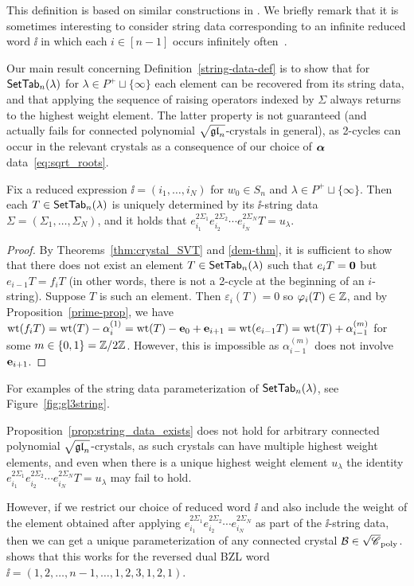 \documentclass[11pt]{article}
\begin{document}
This definition is based on similar constructions in \cite{BZ93,Kashiwara93}.
We briefly remark that it is sometimes interesting to consider string data corresponding to an infinite reduced word $\ii$ in which each $i \in [n-1]$ occurs infinitely often~\cite{BZ01,Littelmann98}.

Our main result concerning Definition~\ref{string-data-def} is to show that for $\mathsf{SetTab}_n(\lambda)$ for $\lambda \in P^+ \sqcup \{\infty\}$  each element can be recovered from its string data, and that applying the sequence of raising operators indexed by $\Sigma$ always returns to the highest weight element.
The latter property is not 
guaranteed (and actually fails for connected polynomial $\sqrt{\mathfrak{gl}_n}$-crystals in general), as 2-cycles can occur in the relevant crystals as a consequence of 
our choice of $\boldsymbol{\alpha}$ data~\eqref{eq:sqrt_roots}.

\begin{proposition}
\label{prop:string_data_exists}
Fix a reduced expression $\ii = (i_1, \dotsc, i_N)$ for $w_0 \in S_n$ and $\lambda \in P^+ \sqcup \{\infty\}$.
Then each $T \in \mathsf{SetTab}_n(\lambda)$ is uniquely determined by its $\ii$-string data $\Sigma = (\Sigma_1, \dotsc, \Sigma_N)$, and it holds that
$
e_{i_1}^{2\Sigma_1} e_{i_2}^{2\Sigma_2} \cdots e_{i_N}^{2\Sigma_N} T = u_{\lambda}.
$
\end{proposition}

\begin{proof}
By Theorems~\ref{thm:crystal_SVT} and \ref{dem-thm}, it is sufficient to show that there does not exist an element $T \in \mathsf{SetTab}_n(\lambda)$ such that $e_i T = \boldsymbol{0}$ but $e_{i-1} T = f_i T$ (in other words, there is not a 2-cycle at the beginning of an $i$-string).
Suppose $T$ is such an element.
Then $\varepsilon_i(T)=0$ so $\varphi_i(T) \in \mathbb{Z}$, and by Proposition~\ref{prime-prop}, we have
$
\operatorname{wt}(f_i T) = \operatorname{wt}(T) - \alpha_i^{(1)} = \operatorname{wt}(T) - \textbf{e}_0 + \textbf{e}_{i+1} = \operatorname{wt}(e_{i-1} T) = \operatorname{wt}(T) + \alpha_{i-1}^{(m)}
$
for some $m \in \{ 0, 1\} = \mathbb{Z}/2\mathbb{Z}$.
However, this is impossible as $\alpha_{i-1}^{(m)}$ does not involve $\textbf{e}_{i+1}$.
\end{proof}

For examples of the string data parameterization of $\mathsf{SetTab}_n(\lambda)$, see Figure~\ref{fig:gl3string}.

\begin{remark}
Proposition~\ref{prop:string_data_exists} does not hold for arbitrary connected polynomial $\sqrt{\mathfrak{gl}_n}$-crystals, as such crystals can have multiple highest weight elements, and even when there is a unique highest weight element $u_{\lambda}$
the identity $e_{i_1}^{2\Sigma_1} e_{i_2}^{2\Sigma_2} \cdots e_{i_N}^{2\Sigma_N}T=u_\lambda $ may fail to hold.

However, if we restrict our choice of reduced word $\ii$ and also include the weight of the element obtained after applying $e_{i_1}^{2\Sigma_1} e_{i_2}^{2\Sigma_2} \cdots e_{i_N}^{2\Sigma_N}$ as part of the $\ii$-string data, then we can get a unique parameterization of any connected crystal $\mathcal{B} \in \sqrt{\mathscr{C}}_{\operatorname{poly}}$.
\cite[Thm.~2.21]{MTY} shows that this works for the reversed dual BZL word
$\ii= (1,2,\dots,n-1,\dots,1,2,3,1,2,1)$.
\end{remark}
\end{document}
